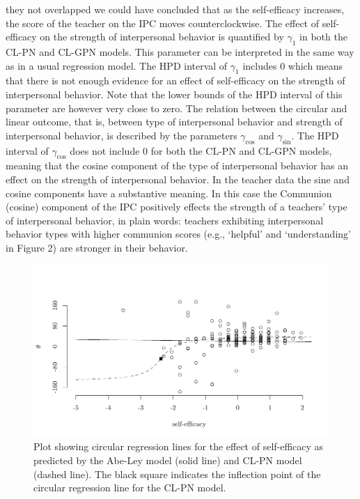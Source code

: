 \documentclass[12pt,]{article}
\begin{document}
they not overlapped we could have concluded that as the self-efficacy
increases, the score of the teacher on the IPC moves counterclockwise.
\newline
\indent The effect of self-efficacy on the strength of interpersonal
behavior is quantified by \(\gamma_1\) in both the CL-PN and CL-GPN
models. This parameter can be interpreted in the same way as in a usual
regression model. The HPD interval of \(\gamma_1\) includes 0 which
means that there is not enough evidence for an effect of self-efficacy
on the strength of interpersonal behavior. Note that the lower bounds of
the HPD interval of this parameter are however very close to
zero.\newline
\indent  The relation between the circular and linear outcome, that is,
between type of interpersonal behavior and strength of interpersonal
behavior, is described by the parameters \(\gamma_{\cos}\) and
\(\gamma_{\sin}\). The HPD interval of \(\gamma_{\cos}\) does not
include 0 for both the CL-PN and CL-GPN models, meaning that the cosine
component of the type of interpersonal behavior has an effect on the
strength of interpersonal behavior. In the teacher data the sine and
cosine components have a substantive meaning. In this case the Communion
(cosine) component of the IPC positively effects the strength of a
teachers' type of interpersonal behavior, in plain words: teachers
exhibiting interpersonal behavior types with higher communion scores
(e.g., `helpful' and `understanding' in Figure 2) are stronger in their
behavior.

\begin{figure}
\centering
\includegraphics[width = \textwidth]{Plots/reglinediffSE.pdf}
\caption{Plot showing circular regression lines for the effect of self-efficacy
as predicted by the Abe-Ley model (solid line) and CL-PN model (dashed line). The
black square indicates the inflection point of the circular regression line for
the CL-PN model.}
\label{regline}
\end{figure}
\end{document}
